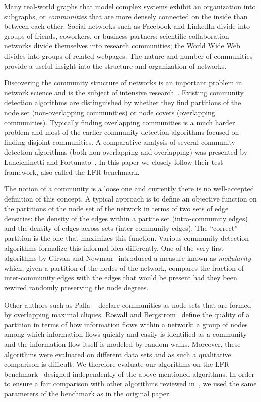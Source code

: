 Many real-world graphs that model complex systems exhibit an organization 
into subgraphs, or \textit{communities} that are more densely connected on the inside than between each other. 
Social networks such as Facebook and LinkedIn divide into groups of friends, 
coworkers, or business partners; scientific collaboration networks divide 
themselves into research communities; the World Wide Web divides into groups 
of related webpages. The nature and number of communities provide 
a useful insight into the structure and organization of networks. 

Discovering the community structure of networks is an 
important problem in network science and is the subject 
of intensive research~\cite{GN02,GN04,CNM04,RCC04,DM04,PDFV05,NL07,BGLL08,RB08,RN09}. 
Existing community detection algorithms are 
distinguished by whether they find partitions of the node set 
(non-overlapping communities) or node covers (overlapping communities). 
Typically finding overlapping communities is a much harder problem and most of the 
earlier community detection algorithms focused on finding disjoint 
communities. A comparative analysis of several community detection algorithms 
(both non-overlapping and overlapping) was presented by Lancichinetti and Fortunato~\cite{LF09}. 
In this paper we closely follow their test framework, also called the LFR-benchmark.

The notion of a community is a loose one and currently there is no 
well-accepted definition of this concept. A typical approach is to define an 
objective function on the partitions of the node set of the network 
in terms of two sets of edge densities: the density of the 
edges within a partite set (intra-community edges) and the density of edges across 
sets (inter-community edges). The ``correct'' partition is the one that maximizes this 
function. Various community detection algorithms formalize this
informal idea differently. One of the very first algorithms by
Girvan and Newman~\cite{GN02} introduced a measure known as \textit{modularity}
which, given a partition of the nodes of the network, compares the fraction of 
inter-community edges with the edges that would be present had they been 
rewired randomly preserving the node degrees. 

Other authors such as Palla \etal~\cite{PDFV05} declare communities as node sets that are formed 
by overlapping maximal cliques. Rosvall and Bergstrom~\cite{RB08} 
define the quality of a partition in terms of how information flows within a network: 
a group of nodes among which information flows quickly and easily is identified 
as a community and the information flow itself is modeled by random walks.
Moreover, these algorithms were evaluated on different data sets and as such 
a qualitative comparison is difficult. We therefore evaluate our algorithms 
on the LFR benchmark~\cite{LF09} designed independently of the above-mentioned algorithms. 
In order to ensure a fair comparison with other algorithms reviewed in~\cite{LF09}, 
we used the same parameters of the benchmark as in the original paper.


